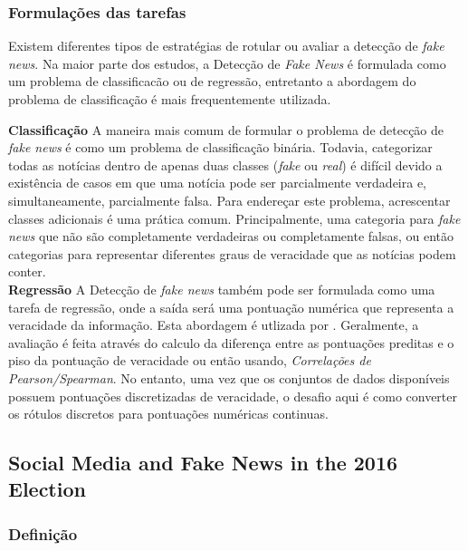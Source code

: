\subsubsection{Formulações das tarefas}

Existem diferentes tipos de estratégias de rotular ou avaliar a detecção de \textit{fake news}. 
Na maior parte dos estudos, a Detecção de \textit{Fake News} é formulada como um problema de classificacão ou de regressão, entretanto a abordagem do problema de classificação é mais frequentemente utilizada. 

\textbf{Classificação} A maneira mais comum de formular o problema de detecção de \textit{fake news} é como um problema de classificação binária. Todavia, categorizar todas as notícias dentro de apenas duas classes (\textit{fake} ou \textit{real}) é difícil devido a existência de casos em que uma notícia pode ser parcialmente verdadeira e, simultaneamente, parcialmente falsa. Para endereçar este problema, acrescentar classes adicionais é uma prática comum. Principalmente, uma categoria para \textit{fake news} que não são  completamente verdadeiras ou completamente falsas, ou então  categorias para representar diferentes graus de veracidade que as notícias podem conter. \\


\textbf{Regressão} A Detecção de \textit{fake news} também pode ser formulada como uma tarefa de regressão, onde a saída será uma pontuação numérica que representa a veracidade da informação. Esta abordagem é utlizada por \cite{nakashole2014}. Geralmente, a avaliação é feita através do calculo da diferença entre as pontuações preditas e o piso da pontuação de veracidade ou então usando, \textit{Correlações de Pearson/Spearman}. No entanto, uma vez que os conjuntos de dados disponíveis possuem pontuações discretizadas de veracidade, o desafio aqui é como converter os rótulos discretos para pontuações numéricas continuas. 


\subsection{Social Media and Fake News in the 2016 Election}

\subsubsection{Definição}

